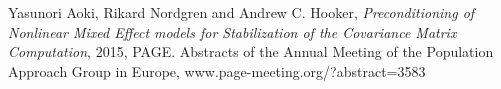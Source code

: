 
\begin{thebibliography}{99}
     Yasunori Aoki, Rikard Nordgren and Andrew C. Hooker, {\em Preconditioning of Nonlinear Mixed Effect models for Stabilization of the Covariance Matrix Computation}, 2015, PAGE. Abstracts of the Annual Meeting of the Population Approach Group in Europe, \mbox{www.page-meeting.org/?abstract=3583} 
\end{thebibliography}



